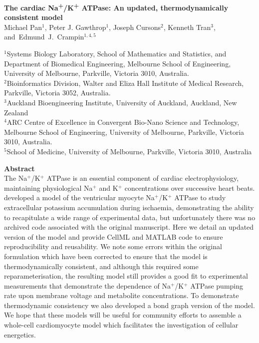 \documentclass[11pt]{article}
\begin{document}
\begin{center}
	{\LARGE\textbf{The cardiac Na\textsuperscript{+}/K\textsuperscript{+} ATPase: An updated, thermodynamically consistent model}} \\
	Michael Pan$^{1}$, Peter J. Gawthrop$^{1}$, Joseph Cursons$^{2}$, Kenneth Tran$^{3}$,  \mbox{and Edmund J. Crampin$^{1,4,5}$} \\[0cm]
\end{center}
{\small
	$^1$Systems Biology Laboratory, School of Mathematics and Statistics, and Department of Biomedical Engineering, Melbourne School of Engineering, University of Melbourne, Parkville, Victoria 3010, Australia. \\
	$^2$Bioinformatics Division, Walter and Eliza Hall Institute of Medical Research, Parkville, Victoria 3052, Australia. \\
	$^3$Auckland Bioengineering Institute, University of Auckland, Auckland, New Zealand \\
	$^4$ARC Centre of Excellence in Convergent Bio-Nano Science and Technology, Melbourne School of Engineering, University of Melbourne, Parkville, Victoria 3010, Australia. \\
	$^5$School of Medicine, University of Melbourne, Parkville, Victoria 3010, Australia }

\textbf{Abstract} \\
The Na$^+$/K$^+$ ATPase is an essential component of cardiac electrophysiology, maintaining physiological Na$^+$ and K$^+$ concentrations over successive heart beats. \citet{terkildsen_balance_2007} developed a model of the ventricular myocyte Na$^+$/K$^+$ ATPase to study extracellular potassium accumulation during ischaemia, demonstrating the ability to recapitulate a wide range of experimental data, but unfortunately there was no archived code associated with the original manuscript. Here we detail an updated version of the model and provide CellML and MATLAB code to ensure reproducibility and reusability. We note some errors within the original formulation which have been corrected to ensure that the model is thermodynamically consistent, and although this required some reparameterisation, the resulting model still provides a good fit to experimental measurements that demonstrate the dependence of Na$^+$/K$^+$ ATPase pumping rate upon membrane voltage and metabolite concentrations. To demonstrate thermodynamic consistency we also developed a bond graph version of the model. We hope that these models will be useful for community efforts to assemble a whole-cell cardiomyocyte model which facilitates the investigation of cellular energetics.
\end{document}
